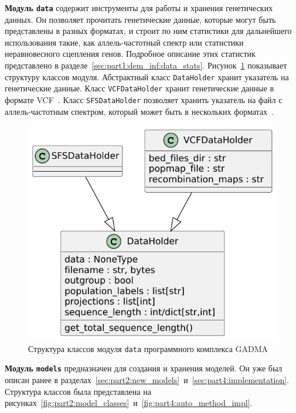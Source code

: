 
\textbf{Модуль \texttt{data}} содержит инструменты для работы и хранения генетических данных.
Он позволяет прочитать генетические данные, которые могут быть представлены в разных форматах, и строит по ним статистики для дальнейшего использования такие, как аллель-частотный спектр или статистики неравновесного сцепления генов.
Подробное описание этих статистик представлено в разделе~\ref{sec:part1:dem_inf:data_stats}.
Рисунок~\ref{fig:part5:data_classes} показывает структуру классов модуля.
Абстрактный класс \texttt{DataHolder} хранит указатель на генетические данные.
Класс \texttt{VCFDataHolder} хранит генетические данные в формате VCF~\cite{danecek2011variant}.
Класс \texttt{SFSDataHolder} позволяет хранить указатель на файл с аллель-частотным спектром, который может быть в нескольких форматах~\cite{gutenkunst2009inferring,kamm2020efficiently,excoffier2013robust}.

\begin{figure}[ht]
    \centering
    \includegraphics[width=0.3\linewidth]{images/part5/data_classes.pdf}
    \caption{Структура классов модуля \texttt{data} программного комплекса GADMA}
    \label{fig:part5:data_classes}
\end{figure}

\textbf{Модуль \texttt{models}} предназначен для создания и хранения моделей.
Он уже был описан ранее в разделах~\ref{sec:part2:new_models}~и~\ref{sec:part4:implementation}.
Структура классов была представлена на рисунках~\ref{fig:part2:model_classes}~и~\ref{fig:part4:auto_method_impl}.




